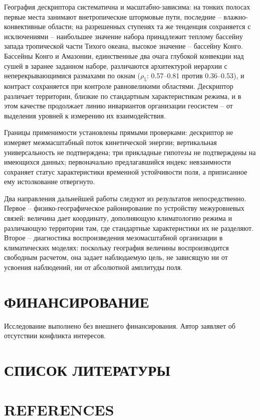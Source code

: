 \documentclass[12pt,a4paper]{article}
\begin{document}
География дескриптора систематична и масштабно-зависима: на тонких полосах первые места занимают внетропические штормовые пути, последние -- влажно-конвективные области; на разрешенных ступенях та же тенденция сохраняется с исключениями -- наибольшее значение набора принадлежит теплому бассейну запада тропической части Тихого океана, высокое значение -- бассейну Конго. Бассейны Конго и Амазонии, единственные два очага глубокой конвекции над сушей в заранее заданном наборе, различаются архитектурой иерархии с неперекрывающимися размахами по окнам ($\rho_5$: 0.57--0.81 против 0.36--0.53), и контраст сохраняется при контроле равновеликими областями. Дескриптор различает территории, близкие по стандартным характеристикам режима, и в этом качестве продолжает линию инвариантов организации геосистем -- от выделения уровней к измерению их взаимодействия.

Границы применимости установлены прямыми проверками: дескриптор не измеряет межмасштабный поток кинетической энергии; вертикальная универсальность не подтверждена; три прикладные гипотезы не подтверждены на имеющихся данных; первоначально предлагавшийся индекс невзаимности сохраняет статус характеристики временной устойчивости поля, а приписанное ему истолкование отвергнуто.

Два направления дальнейшей работы следуют из результатов непосредственно. Первое -- физико-географическое районирование по устройству межуровневых связей: величина дает координату, дополняющую климатологию режима и различающую территории там, где стандартные характеристики их не разделяют. Второе -- диагностика воспроизведения мезомасштабной организации в климатических моделях: поскольку география величины воспроизводится свободным расчетом, она задает наблюдаемую цель, не зависящую ни от усвоения наблюдений, ни от абсолютной амплитуды поля.

\section{ФИНАНСИРОВАНИЕ}

Исследование выполнено без внешнего финансирования. Автор заявляет об отсутствии конфликта интересов.

\clearpage
\section{СПИСОК ЛИТЕРАТУРЫ}


\clearpage
\section{REFERENCES}
\end{document}
